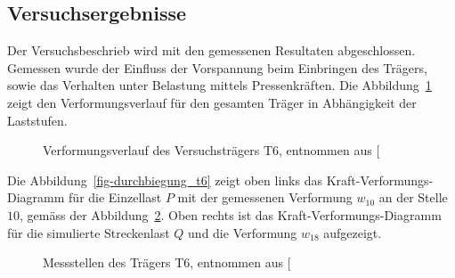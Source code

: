 \documentclass[
  11pt,
  letterpaper,
]{scrreprt}
\begin{document}
\subsection{Versuchsergebnisse}\label{versuchsergebnisse-2}

Der Versuchsbeschrieb wird mit den gemessenen Resultaten abgeschlossen.
Gemessen wurde der Einfluss der Vorspannung beim Einbringen des Trägers,
sowie das Verhalten unter Belastung mittels Pressenkräften. Die
Abbildung~\ref{fig-durchbiegung_laengs_t6} zeigt den Verformungsverlauf
für den gesamten Träger in Abhängigkeit der Laststufen.

\begin{figure}[H]


\caption{\label{fig-durchbiegung_laengs_t6}Verformungsverlauf des
Versuchsträgers T6, entnommen aus
{[}\citeproc{ref-sigrist_versuche_1993}{5}{]}}

\end{figure}%

Die Abbildung~\ref{fig-durchbiegung_t6} zeigt oben links das
Kraft-Verformungs-Diagramm für die Einzellast \(P\) mit der gemessenen
Verformung \(w_{10}\) an der Stelle \(10\), gemäss der
Abbildung~\ref{fig-messstellen_t6}. Oben rechts ist das
Kraft-Verformungs-Diagramm für die simulierte Streckenlast \(Q\) und die
Verformung \(w_{18}\) aufgezeigt.

\begin{figure}[H]


\caption{\label{fig-messstellen_t6}Messstellen des Trägers T6, entnommen
aus {[}\citeproc{ref-sigrist_versuche_1993}{5}{]}}

\end{figure}%
\end{document}
